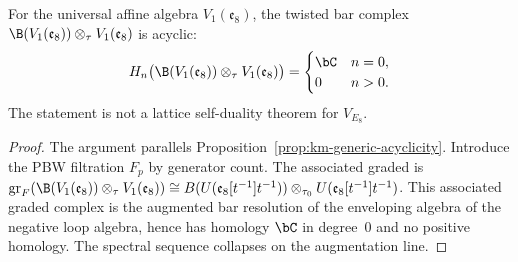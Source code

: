 \begin{proposition}
\label{prop:E8-koszul-acyclic}
For the universal affine algebra $V_1(\mathfrak e_8)$, the twisted
bar complex
$\B(V_1(\mathfrak e_8)) \otimes_\tau V_1(\mathfrak e_8)$ is acyclic:
\[
H_n\bigl(\B(V_1(\mathfrak e_8)) \otimes_\tau V_1(\mathfrak e_8)\bigr) = \begin{cases}
\bC & n = 0, \\
0 & n > 0.
\end{cases}
\]
The statement is not a lattice self-duality theorem for $V_{E_8}$.
\end{proposition}

\begin{proof}
The argument parallels Proposition~\ref{prop:km-generic-acyclicity}.
Introduce the PBW filtration $F_p$ by generator count. The
associated graded is $\mathrm{gr}_F(\B(V_1(\mathfrak e_8)) \otimes_\tau V_1(\mathfrak e_8))
\cong B(U(\mathfrak{e}_8[t^{-1}]t^{-1}))\otimes_{\tau_0}
U(\mathfrak{e}_8[t^{-1}]t^{-1})$.
This associated graded complex is the augmented bar resolution of
the enveloping algebra of the negative loop algebra, hence has
homology $\bC$ in degree~$0$ and no positive homology. The spectral
sequence collapses on the augmentation line.
\end{proof}

